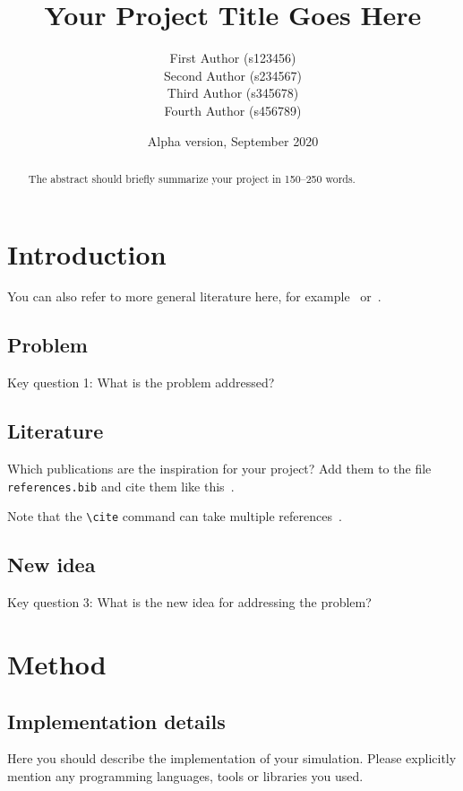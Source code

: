 \documentclass[a4paper,11pt]{article}
\title{Your Project Title Goes Here}
\author{
  First Author (s123456)
  \\
  Second Author (s234567)
  \\
  Third Author (s345678)
  \\
  Fourth Author (s456789)
}
\date{Alpha version, September 2020} %
\begin{document}
\maketitle

\begin{abstract}
The abstract should briefly summarize your project in 150--250 words.
\end{abstract}

\section{Introduction}

You can also refer to more general literature here, for example~\cite{WooldridgeMAS} or~\cite{wiki:SchellingSegregation}.

\subsection{Problem}

Key question 1: What is the problem addressed?

\subsection{Literature}


Which publications are the inspiration for your project?
Add them to the file \texttt{references.bib} and cite them like this~\cite{dWVV2013:ToM}.

Note that the \verb|\cite| command can take multiple references~\cite{vDGKK2019:ReachGossip,vdBerg2019:UnreliableGossip,HvKLL2019:SupermarketQ}.

\subsection{New idea}

Key question 3: What is the new idea for addressing the problem?

\section{Method}


\subsection{Implementation details}

Here you should describe the implementation of your simulation.
Please explicitly mention any programming languages, tools or libraries you used.
\end{document}
